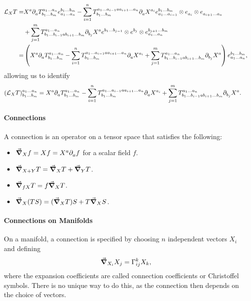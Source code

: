 \begin{align*}
	\lied{X}{T} =& X^{a}\del{a}{\tensor*{T}{^{a_{1}\dots a_{n}}_{b_{1}\dots b_{m}}}}\tensor*{e}{^{b_{1}\dots b_{m}}_{a_{1}\dots a_{n}}} - \sum\limits_{i = 1}^{n}\tensor*{T}{^{a_{1}\dots a_{i - 1}aa_{i + 1}\dots a_{n}}_{b_{1}\dots b_{m}}}\del{a}{X^{a_{i}}}\tensor*{e}{^{b_{1}\dots b_{m}}_{a_{1}\dots a_{i - 1}}}\otimes\tensor*{e}{_{a_{i}}}\otimes\tensor*{e}{_{a_{i + 1}\dots a_{n}}} \\
	             &+ \sum\limits_{j = 1}^{m}\tensor*{T}{^{a_{1}\dots a_{n}}_{b_{1}\dots b_{i - 1}ab_{i + 1}\dots b_{m}}}\del{b_{j}}{X^{a}}\tensor*{e}{^{b_{1}\dots b_{j - 1}}}\otimes\tensor*{e}{^{b_{j}}}\otimes\tensor*{e}{^{b_{j + 1}\dots b_{m}}_{a_{1}\dots a_{n}}} \\
	            =& \left(X^{a}\del{a}{\tensor*{T}{^{a_{1}\dots a_{n}}_{b_{1}\dots b_{m}}}} - \sum\limits_{i = 1}^{n}\tensor*{T}{^{a_{1}\dots a_{i - 1}aa_{i + 1}\dots a_{n}}_{b_{1}\dots b_{m}}}\del{a}{X^{a_{i}}} + \sum\limits_{j = 1}^{m}\tensor*{T}{^{a_{1}\dots a_{n}}_{b_{1}\dots b_{i - 1}ab_{i + 1}\dots b_{m}}}\del{b_{j}}{X^{a}}\right)\tensor*{e}{^{b_{1}\dots b_{m}}_{a_{1}\dots a_{n}}},
\end{align*}
allowing us to identify
\begin{align*}
	\tensor*{(\lied{X}{T})}{^{a_{1}\dots a_{n}}_{b_{1}\dots b_{m}}} &= X^{a}\del{a}{\tensor*{T}{^{a_{1}\dots a_{n}}_{b_{1}\dots b_{m}}}} - \sum\limits_{i = 1}^{n}\tensor*{T}{^{a_{1}\dots a_{i - 1}aa_{i + 1}\dots a_{n}}_{b_{1}\dots b_{m}}}\del{a}{X^{a_{i}}} + \sum\limits_{j = 1}^{m}\tensor*{T}{^{a_{1}\dots a_{n}}_{b_{1}\dots b_{i - 1}ab_{i + 1}\dots b_{m}}}\del{b_{j}}{X^{a}}.
\end{align*}

\paragraph{Connections}
A connection is an operator on a tensor space that satisfies the following:
\begin{itemize}
	\item $\grad_{X}{f} = Xf = X^{a}\partial^{}_{a}f$ for a scalar field $f$.
	\item $\grad_{X + Y}{T} = \grad_{X}{T} + \grad_{Y}{T}$.
	\item $\grad_{fX}{T} = f\grad_{X}{T}$.
	\item $\grad_{X}{(TS)} = (\grad_{X}{T})S + T\grad_{X}{S}$.
\end{itemize}

\paragraph{Connections on Manifolds}
On a manifold, a connection is specified by choosing $n$ independent vectors $X_{i}$ and defining
\begin{align*}
	\dcov{X_{i}}{X_{j}} = \chris{k}{i}{j}X_{k},
\end{align*}
where the expansion coefficients are called connection coefficients or Christoffel symbols. There is no unique way to do this, as the connection then depends on the choice of vectors.

